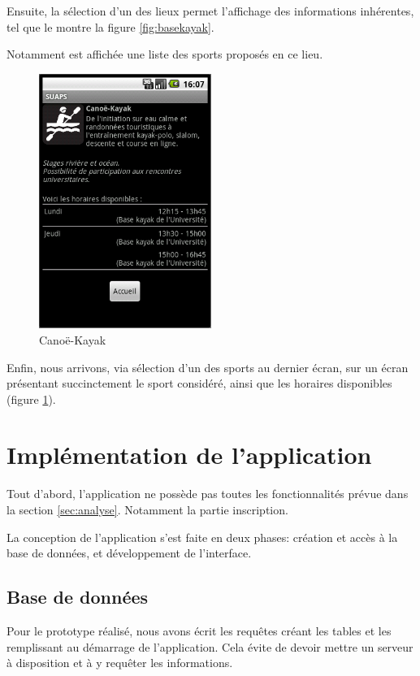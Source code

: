 \documentclass{article}
\begin{document}
	Ensuite, la sélection d'un des lieux permet l'affichage des informations
	inhérentes, tel que le montre la figure \ref{fig:basekayak}.

	Notamment est affichée une liste des sports proposés en ce lieu.

	\begin{figure}[ht]
		\centering
		\includegraphics[width=0.5\textwidth]{canoekayak.png}
		\caption{Canoë-Kayak}
		\label{fig:canoekayak}
	\end{figure}

	Enfin, nous arrivons, via sélection d'un des sports au dernier écran, sur un
	écran présentant succinctement le sport considéré, ainsi que les horaires
	disponibles (figure \ref{fig:canoekayak}).

\section{Implémentation de l'application}

    Tout d'abord, l'application ne possède pas toutes les fonctionnalités prévue
    dans la section \ref{sec:analyse}. Notamment la partie inscription.


    La conception de l'application s'est faite en deux phases: création et accès
    à la base de données, et développement de l'interface.

    \subsection{Base de données}

        Pour le prototype réalisé, nous avons écrit les requêtes créant les
        tables et les remplissant au démarrage de l'application. Cela évite de
        devoir mettre un serveur à disposition et à y requêter les informations.
\end{document}
